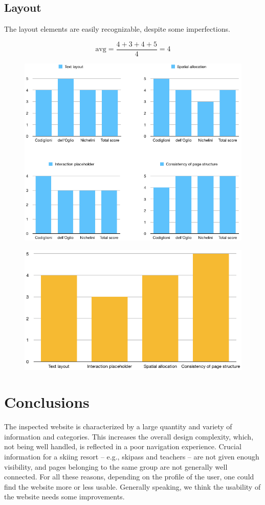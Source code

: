 \documentclass[a4paper, 11pt, parskip=half, headsepline]{scrreprt}
\begin{document}
\section{Layout}

The layout elements are easily recognizable, despite some imperfections.

\[ \mathrm{avg} = \frac{4+3+4+5}{4} = 4 \]

\begin{figure}[H]
    \centering
    \includegraphics[width=0.8\linewidth, keepaspectratio]{layout-graph-1}
\end{figure}

\begin{figure}[H]
    \centering
    \includegraphics[width=0.75\linewidth, keepaspectratio]{layout-graph-2}
\end{figure}




\chapter{Conclusions}
\label{chapter:conclusions}

The inspected website is characterized by a large quantity and variety of information and categories. This increases the overall design complexity, which, not being well handled, is reflected in a poor navigation experience. Crucial information for a skiing resort -- e.g., skipass and teachers -- are not given enough visibility, and pages belonging to the same group are not generally well connected. For all these reasons, depending on the profile of the user, one could find the website more or less usable. Generally speaking, we think the usability of the website needs some improvements.
\end{document}

